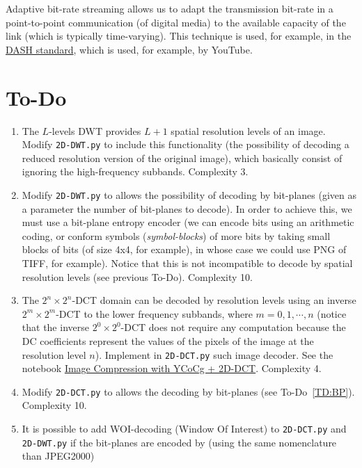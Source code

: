 Adaptive bit-rate streaming allows us to adapt the transmission bit-rate
in a point-to-point communication (of digital media) to the available
capacity of the link (which is typically time-varying). This
technique is used, for example, in the
\href{https://en.wikipedia.org/wiki/Dynamic_Adaptive_Streaming_over_HTTP}{DASH
  standard}, which is used, for example, by YouTube.


\section{To-Do}
\begin{enumerate}
\item The $L$-levels DWT provides $L+1$ spatial resolution levels of
  an image. Modify \texttt{2D-DWT.py} to include this functionality
  (the possibility of decoding a reduced resolution version of the
  original image), which basically consist of ignoring the
  high-frequency subbands. Complexity 3.
\item \label{TD:BP} Modify \texttt{2D-DWT.py} to allows the
  possibility of decoding by bit-planes (given as a parameter the
  number of bit-planes to decode). In order to achieve this, we must
  use a bit-plane entropy encoder (we can encode bits using an
  arithmetic coding, or conform symbols (\emph{symbol-blocks}) of more
  bits by taking small blocks of bits (of size 4x4, for example), in
  whose case we could use PNG of TIFF, for example). Notice that this is not
  incompatible to decode by spatial resolution levels (see previous
  To-Do). Complexity 10.
\item The $2^n\times 2^n$-DCT domain can be decoded by resolution
  levels using an inverse $2^m\times 2^m$-DCT to the lower frequency
  subbands, where $m=0,1,\cdots,n$ (notice that the inverse
  $2^0\times 2^0$-DCT does not require any computation because the DC
  coefficients represent the values of the pixels of the image at the
  resolution level $n$). Implement in \texttt{2D-DCT.py} such image
  decoder. See the notebook
  \href{https://github.com/vicente-gonzalez-ruiz/DCT2D/blob/master/src/DCT2D/YCoCg_2D_DCT_SQ.ipynb}{Image
    Compression with YCoCg + 2D-DCT}. Complexity 4.
\item Modify \texttt{2D-DCT.py} to allows the decoding by bit-planes
  (see To-Do~\ref{TD:BP}). Complexity 10.
\item It is possible to add WOI-decoding (Window Of Interest) to
  \texttt{2D-DCT.py} and \texttt{2D-DWT.py} if the bit-planes are
  encoded by (using the same nomenclature than JPEG2000)

\end{enumerate}
